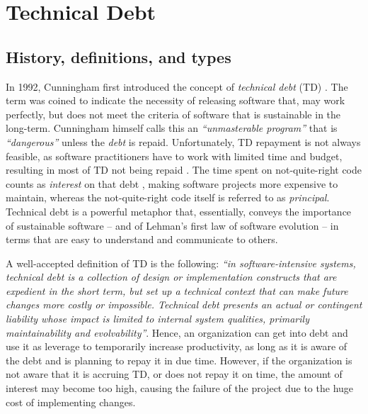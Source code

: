 \section{Technical Debt}
\subsection{History, definitions, and types}
In 1992, Cunningham first introduced the concept of \emph{technical debt} (TD) \cite{Cunningham1992}. 
The term was coined to indicate the necessity of releasing software that, may work perfectly, but does not meet the criteria of software that is sustainable in the long-term. 
Cunningham himself calls this an \emph{``unmasterable program''} that is \emph{``dangerous''} unless the \emph{debt} is repaid.
Unfortunately, TD repayment is not always feasible, as software practitioners have to work with limited time and budget, resulting in most of TD not being repaid \cite{Digkas2018}.
The time spent on not-quite-right code counts as \emph{interest} on that debt \cite{Cunningham1992}, making software projects more expensive to maintain, whereas the not-quite-right code itself is referred to as \emph{principal}.
Technical debt is a powerful metaphor that, essentially, conveys the importance of sustainable software -- and of Lehman's first law of software evolution -- in terms that are easy to understand and communicate to others. 


A well-accepted definition of TD is the following: 
\emph{``in software-intensive systems, technical debt is a collection of design or implementation constructs that are expedient in the short term, but set up a technical context that can make future changes more costly or impossible. Technical debt presents an actual or contingent liability whose impact is limited to internal system qualities, primarily maintainability and evolvability''}\cite{Avgeriou2016}. 
Hence, an organization can get into debt and use it as leverage to temporarily increase productivity, as long as it is aware of the debt and is planning to repay it in due time.
However, if the organization is not aware that it is accruing TD, or does not repay it on time, the amount of interest may become too high, causing the failure of the project due to the huge cost of implementing changes.

